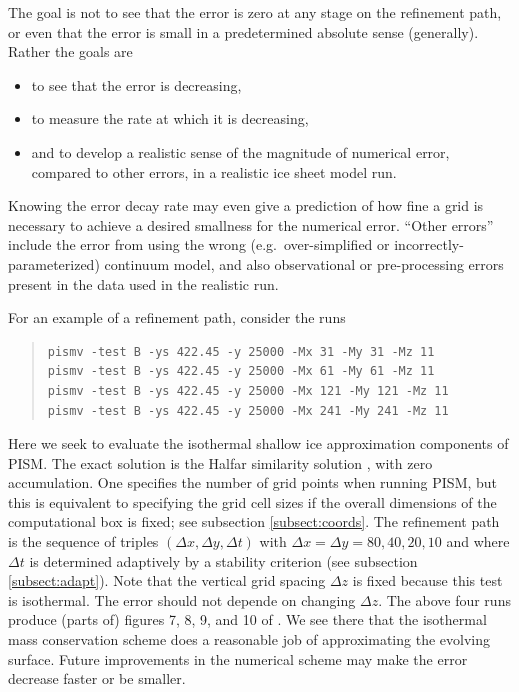 \documentclass[11pt,final]{amsart}
\begin{document}
The goal is not to see that the error is zero at any stage on the refinement path, or even that the error is small in a predetermined absolute sense (generally).  Rather the goals are \begin{itemize}
\item to see that the error is decreasing,
\item to measure the rate at which it is decreasing,
\item and to develop a realistic sense of the magnitude of numerical error, compared to other errors, in a realistic ice sheet model run.
\end{itemize}
Knowing the error decay rate may even give a prediction of how fine a grid is necessary to achieve a desired smallness for the numerical error.  ``Other errors'' include the error from using the wrong (e.g.~over-simplified or incorrectly-parameterized) continuum model, and also observational or pre-processing errors present in the data used in the realistic run.

For an example of a refinement path, consider the runs
\begin{quote}\small
\begin{verbatim}
pismv -test B -ys 422.45 -y 25000 -Mx 31 -My 31 -Mz 11
pismv -test B -ys 422.45 -y 25000 -Mx 61 -My 61 -Mz 11
pismv -test B -ys 422.45 -y 25000 -Mx 121 -My 121 -Mz 11
pismv -test B -ys 422.45 -y 25000 -Mx 241 -My 241 -Mz 11
\end{verbatim}
\normalsize\end{quote}
Here we seek to evaluate the isothermal shallow ice approximation components of PISM.  The exact solution is the Halfar similarity solution \cite{Halfar83}, with zero accumulation.  One specifies the number of grid points when running PISM, but this is equivalent to specifying the grid cell sizes if the overall dimensions of the computational box is fixed; see subsection \ref{subsect:coords}.  The refinement path is the sequence of triples $(\Delta x,\Delta y,\Delta t)$ with $\Delta x = \Delta y = 80,40,20,10$ and where $\Delta t$ is determined adaptively by a stability criterion (see subsection \ref{subsect:adapt}).  Note that the vertical grid spacing $\Delta z$ is fixed because this test is isothermal.  The error should not depende on changing $\Delta z$.  The above four runs produce (parts of) figures 7, 8, 9, and 10 of \cite{BLKCB}.  We see there that the isothermal mass conservation scheme does a reasonable job of approximating the evolving surface.  Future improvements in the numerical scheme may make the error decrease faster or be smaller.
\end{document}
